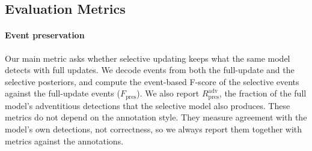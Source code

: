 \documentclass[algorithms,article,submit,pdftex,oneauthor]{Definitions/mdpi}
\begin{document}
\begin{table}[H]
\caption{Annotation statistics differ between releases (durations in seconds; median [interquartile range]).}
\label{tab:shift}
\centering
\setlength{\tabcolsep}{4pt}
\end{table}

\subsection{Evaluation Metrics}
\label{sec:metrics}
\paragraph*{Event preservation} Our main metric asks whether selective updating keeps what the same model detects with full updates. We decode events from both the full-update and the selective posteriors, and compute the event-based F-score of the selective events against the full-update events ($F_{\mathrm{pres}}$). We also report $R^{\mathrm{adv}}_{\mathrm{pres}}$, the fraction of the full model's adventitious detections that the selective model also produces. These metrics do not depend on the annotation style. They measure agreement with the model's own detections, not correctness, so we always report them together with metrics against the annotations.
\end{document}
